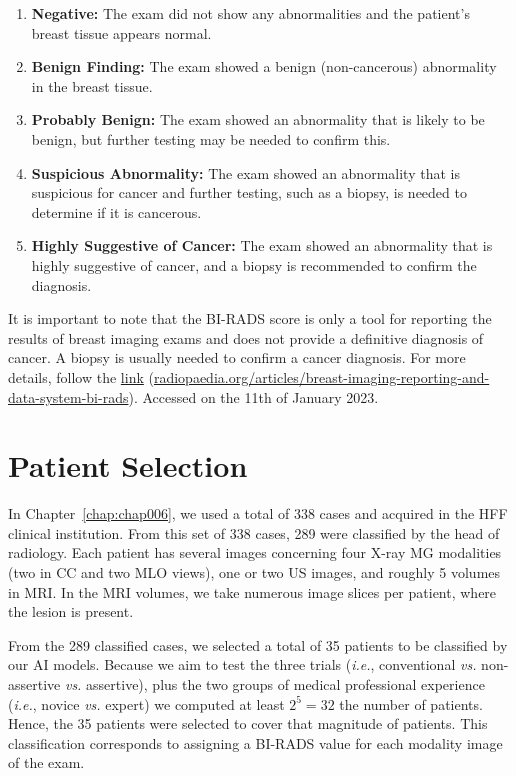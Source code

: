 \vspace{0.5mm}

\begin{enumerate}
\item {\bf Negative:} The exam did not show any abnormalities and the patient's breast tissue appears normal.
\item {\bf Benign Finding:} The exam showed a benign (non-cancerous) abnormality in the breast tissue.
\item {\bf Probably Benign:} The exam showed an abnormality that is likely to be benign, but further testing may be needed to confirm this.
\item {\bf Suspicious Abnormality:} The exam showed an abnormality that is suspicious for cancer and further testing, such as a biopsy, is needed to determine if it is cancerous.
\item {\bf Highly Suggestive of Cancer:} The exam showed an abnormality that is highly suggestive of cancer, and a biopsy is recommended to confirm the diagnosis.
\end{enumerate}

\vspace{0.5mm}

It is important to note that the \ac{BI-RADS} score is only a tool for reporting the results of breast imaging exams and does not provide a definitive diagnosis of cancer.
A biopsy is usually needed to confirm a cancer diagnosis.
For more details, follow the \href{https://radiopaedia.org/articles/breast-imaging-reporting-and-data-system-bi-rads}{link} (\href{https://radiopaedia.org/articles/breast-imaging-reporting-and-data-system-bi-rads}{radiopaedia.org/articles/breast-imaging-reporting-and-data-system-bi-rads}).
Accessed on the 11th of January 2023.

\section{Patient Selection}
\label{sec:app001002}

In Chapter~\ref{chap:chap006}, we used a total of 338 cases and acquired in the \ac{HFF} clinical institution.
From this set of 338 cases, 289 were classified by the head of radiology.
Each patient has several images concerning four X-ray \ac{MG} modalities (two in \ac{CC} and two \ac{MLO} views), one or two US images, and roughly 5 volumes in \ac{MRI}.
In the \ac{MRI} volumes, we take numerous image slices per patient, where the lesion is present.

From the 289 classified cases, we selected a total of 35 patients to be classified by our \ac{AI} models.
Because we aim to test the three trials ({\it i.e.}, conventional {\it vs.} non-assertive {\it vs.} assertive), plus the two groups of medical professional experience ({\it i.e.}, novice {\it vs.} expert) we computed at least $2^5=32$ the number of patients.
Hence, the 35 patients were selected to cover that magnitude of patients.
This classification corresponds to assigning a \ac{BI-RADS} value for each modality image of the exam.

